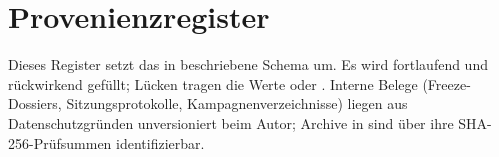 
\chapter{Provenienzregister}
\label{app:provenienz}

Dieses Register setzt das in  beschriebene Schema um. Es wird fortlaufend und
rückwirkend gefüllt; Lücken tragen die Werte  oder . Interne
Belege (Freeze-Dossiers, Sitzungsprotokolle, Kampagnenverzeichnisse) liegen aus Datenschutzgründen
unversioniert beim Autor; Archive in  sind über ihre SHA-256-Prüfsummen identifizierbar.


